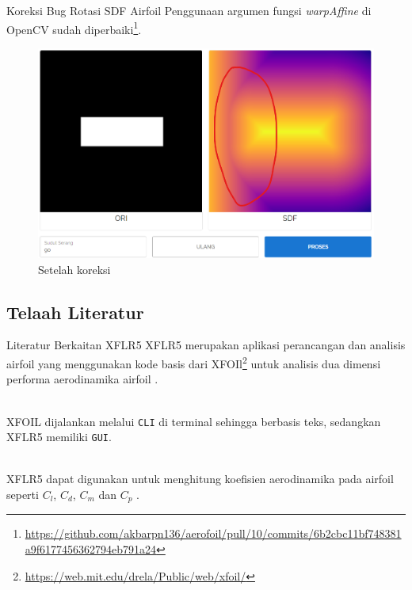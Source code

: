 \begin{frame}{Koreksi Bug Rotasi SDF Airfoil}
  Penggunaan argumen fungsi \textit{warpAffine} di OpenCV sudah diperbaiki\footnote{\url{https://github.com/akbarpn136/aerofoil/pull/10/commits/6b2cbc11bf748381a9f6177456362794eb791a24}}.

   \begin{figure}[h]
    \centering
    \includegraphics[width=0.5\linewidth]{statics/bug_rotasi}
    \caption{Setelah koreksi}
  \end{figure}
\end{frame}

\subsection{Telaah Literatur}

\begin{frame}{Literatur Berkaitan XFLR5}
  XFLR5 merupakan aplikasi perancangan dan analisis airfoil yang menggunakan kode basis dari XFOIl\footnote{\url{https://web.mit.edu/drela/Public/web/xfoil/}} untuk analisis dua dimensi performa aerodinamika airfoil \cite{guzelbey2018numerical}.\\~\\

  \pause

  XFOIL dijalankan melalui \texttt{CLI} di terminal sehingga berbasis teks, sedangkan XFLR5 memiliki \texttt{GUI}.\\~\\

  \pause

  XFLR5 dapat digunakan untuk menghitung koefisien aerodinamika pada airfoil seperti $C_l$, $C_d$, $C_m$ dan $C_p$ \cite{Deperrois2009}.
\end{frame}

